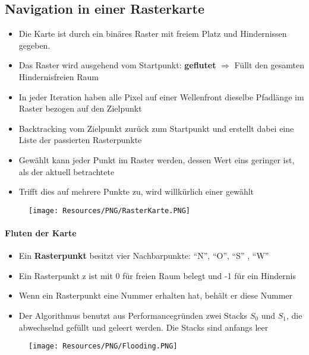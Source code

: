 \subsection{Navigation in einer Rasterkarte}
\begin{itemize}
	\item Die Karte ist durch ein binäres Raster mit freiem Platz und Hindernissen gegeben.
	\item Das Raster wird ausgehend vom Startpunkt: \textbf{geflutet} $\Rightarrow$ Füllt den gesamten Hindernisfreien Raum
	\item In jeder Iteration haben alle Pixel auf einer Wellenfront dieselbe Pfadlänge im Raster bezogen auf den Zielpunkt
	\item Backtracking vom Zielpunkt zurück zum Startpunkt und erstellt dabei eine Liste der passierten Rasterpunkte
	\item Gewählt kann jeder Punkt im Raster werden, dessen Wert eins geringer ist, als der aktuell betrachtete
	\item Trifft dies auf mehrere Punkte zu, wird willkürlich einer gewählt
\end{itemize}
\begin{figure}[H]
	\begin{center}
		\texttt{[image: Resources/PNG/RasterKarte.PNG]}
		\caption{}
		\label{fig:PNG/RasterKarte.PNG}
	\end{center}
\end{figure}
\paragraph{Fluten der Karte}
\begin{itemize}
	\item Ein \textbf{Rasterpunkt} besitzt vier Nachbarpunkte: \enquote{N}, \enquote{O}, \enquote{S} , \enquote{W}
	\item Ein Rasterpunkt z ist mit 0 für freien Raum belegt und -1 für ein Hindernis
	\item Wenn ein Rasterpunkt eine Nummer erhalten hat, behält er diese Nummer
	\item Der Algorithmus benutzt aus Performancegründen zwei Stacks $S_0$ und $S_1$, die abwechselnd gefüllt und geleert werden. Die Stacks sind anfangs leer
\end{itemize}
\begin{figure}[H]
	\begin{center}
		\texttt{[image: Resources/PNG/Flooding.PNG]}
		\caption{}
		\label{fig:PNG/Flooding.PNG}
	\end{center}
\end{figure}
